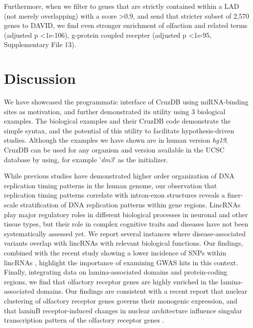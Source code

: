 \documentclass{bioinfo}
\begin{document}
Furthermore, when we filter to genes that are strictly contained within a LAD (not merely overlapping) with a score \textgreater 0.9, and send that stricter subset of 2,570 genes to DAVID, we find even stronger enrichment of olfaction and related terms (adjusted p \textless  1e-106), g-protein coupled recepter (adjusted p \textless  1e-95, Supplementary File 13).




\section{Discussion}

We have showcased the programmatic interface of CruzDB using miRNA-binding sites as motivation, and further demonstrated its utility using 3 biological examples.
The biological examples and their CruzDB code demonstrate the simple syntax, and the potential of this utility to facilitate hypothesis-driven studies. Although the examples we have shown are in human version \textit{hg19}, CruzDB can be used for any organism and version available in the UCSC database by using, for example '\textit{dm3}' as the initializer.

While previous studies have demonstrated higher order organization of DNA replication timing patterns in the human genome, our observation that replication timing patterns correlate with intron-exon structures reveals a finer-scale stratification of DNA replication patterns within gene regions. LincRNAs play major regulatory roles in different biological processes in neuronal and other tissue types, but their role in complex cognitive traits and diseases have not been systematically assessed yet. We report several instances where disease-associated variants overlap with lincRNAs with relevant biological functions. Our findings, combined with the recent study showing a lower incidence of SNPs within lincRNAs \citep{Chen}, highlight the importance of examining GWAS hits in this context. Finally, integrating data on lamina-associated domains and protein-coding regions, we find that olfactory receptor genes are highly enriched in the lamina-associated domains. Our findings are consistent with a recent report that nuclear clustering of olfactory receptor genes governs their monogenic expression, and that laminB receptor-induced changes in nuclear architecture influence singular transcription pattern of the olfactory receptor genes \citep{Clowney}. 
\end{document}
